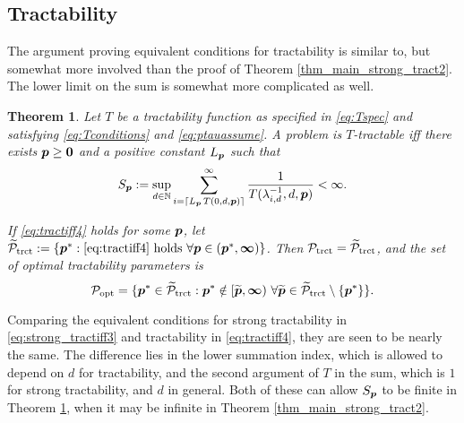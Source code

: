 \documentclass[sort&compress]{elsarticle}
\newtheorem{theorem}{Theorem}
\begin{document}
\subsection{Tractability} \label{sec:tractability}


The argument proving equivalent conditions for tractability is similar to, but somewhat more involved than the proof of Theorem \ref{thm_main_strong_tract2}.  The lower limit on the sum is somewhat more complicated as well.

\begin{theorem}\label{thm_main_tract2}
Let $T$ be a tractability function as specified in \eqref{eq:Tspec} and satisfying \eqref{eq:Tconditions} and \eqref{eq:ptauassume}.  A problem is $T$-tractable iff there exists $\boldsymbol{p}\ge \boldsymbol{0}$ and a positive constant $L_{\boldsymbol{p}}$ such that
\begin{equation} \label{eq:tractiff4}
     S_{\boldsymbol{p}}:=\sup_{d \in \mathbb{N}}
     \sum_{i = \lceil L_{\boldsymbol{p}}\, T(0,d,\boldsymbol{p}) \rceil}^\infty \frac{1}{T(\lambda^{-1}_{i,d},d,\boldsymbol{p})}< \infty.
\end{equation}

If \eqref{eq:tractiff4} holds for some $\boldsymbol{p}$, let $\widetilde{\mathcal{P}}_{\textup{trct}} : = \{\boldsymbol{p}^* : \eqref{eq:tractiff4} \text{ holds }\forall \boldsymbol{p} \in (\boldsymbol{p}^*,\boldsymbol{\infty}) \}$.
Then $\mathcal{P}_{\textup{trct}} = \widetilde{\mathcal{P}}_{\textup{trct}}$, and the set of optimal  tractability parameters is
\[
\mathcal{P}_{\textup{opt}} =
\{\boldsymbol{p}^* \in \widetilde{\mathcal{P}}_{\textup{trct}} :  \boldsymbol{p}^* \notin [\widetilde{\boldsymbol{p}},\boldsymbol{\infty}) \ \forall \widetilde{\boldsymbol{p}}\in  \widetilde{\mathcal{P}}_{\textup{trct}} \setminus \{\boldsymbol{p}^*\} \}.
\]

\end{theorem}

Comparing the equivalent conditions for strong tractability in \eqref{eq:strong_tractiff3} and tractability in \eqref{eq:tractiff4}, they are seen to be nearly the same.  The difference lies in the lower summation index, which is allowed to depend on $d$ for tractability, and the second argument of $T$ in the sum, which is $1$ for strong tractability, and $d$ in general.  Both of these can allow $S_{\boldsymbol{p}}$ to be finite in Theorem \ref{thm_main_tract2}, when it may be infinite in Theorem \ref{thm_main_strong_tract2}.
\end{document}
